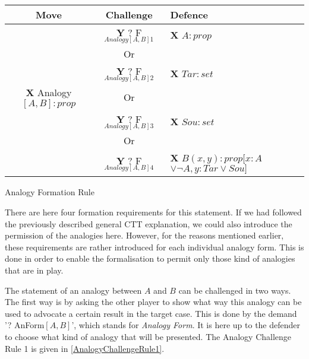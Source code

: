 					\begin{Scheme}[h] 
					\small
        			\centering
               		\begin{tabularx}{\textwidth}{c|c|X}
               			      \textbf{Move}        &            \textbf{Challenge}            &        \textbf{Defence}         \\ \toprule
               										& \textbf{Y} ? F$_{Analogy[A,B]1}$ & \textbf{X} $A : prop$ \\
               			                           &                    Or                    &                    \\
               			                           & \textbf{Y} ? F$_{Analogy[A,B]2}$ & \textbf{X} $Tar : set$ \\
               			     \textbf{X} Analogy$[A,B] : prop$ &                    Or                    &                   \\
               			                           & \textbf{Y} ? F$_{Analogy[A,B]3}$ & \textbf{X} $Sou : set$ \\
               			                           &                    Or                    &                   \\
               			                           & \textbf{Y} ? F$_{Analogy[A,B]4}$ & \textbf{X} $B(x,y) : prop[x : A$ \newline \phantom{\textbf{X}} $\lor \neg A, y : Tar \lor Sou]$ \\ \bottomrule
               		\end{tabularx}	
               		\caption{Analogy Formation Rule}
                	\label{AnalogyFormation}
					\end{Scheme}
					
		There are here four formation requirements for this statement. If we had followed the previously described general CTT explanation, we could also introduce the permission of the analogies here. However, for the reasons mentioned earlier, these requirements are rather introduced for each individual analogy form. This is done in order to enable the formalisation to permit only those kind of analogies that are in play.
		
		The statement of an analogy between $A$ and $B$ can be challenged in two ways. The first way is by asking the other player to show what way this analogy can be used to advocate a certain result in the target case. This is done by the demand '? AnForm$[A,B]$', which stands for \textit{Analogy Form}. It is here up to the defender to choose what kind of analogy that will be presented. The Analogy Challenge Rule 1 is given in \autoref{AnalogyChallengeRule1}.
					
